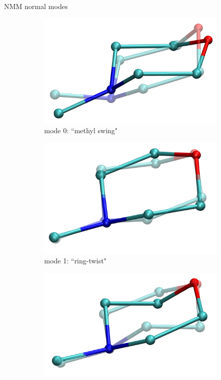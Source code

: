 \documentclass{beamer}
\begin{document}
\begin{frame}{NMM normal modes}
	\newcommand{\x}{0.15}
	\begin{figure}
		\centering
		\begin{subfigure}{\x\textwidth}
			\includegraphics[width=\textwidth]{mode0_ot.png}
			\caption{mode 0: ``methyl swing"}
		\end{subfigure}
		\begin{subfigure}{\x\textwidth}
			\includegraphics[width=\textwidth]{mode1_ot.png}
			\caption{mode 1: ``ring-twist"}
		\end{subfigure}
		\begin{subfigure}{\x\textwidth}
			\includegraphics[width=\textwidth]{mode2_ot.png}

\end{subfigure}
\end{figure}
\end{frame}
\end{document}
